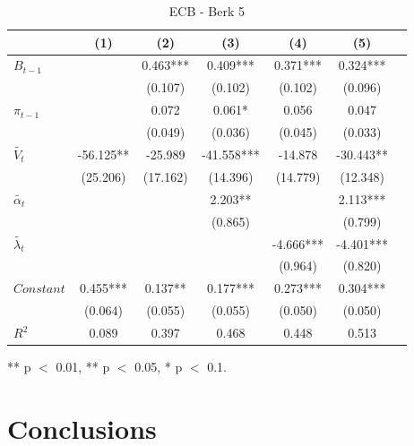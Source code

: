 \documentclass[review]{elsarticle}
\begin{document}
\begin{table}[!ht]
\centering 
  \caption{ECB - Berk 5} 
  \label{tab:ECB - Berk 5}
\begin{tabular}{l*{6}{c}}   
\toprule
                    & (1) & (2) & (3) & (4) & (5) \\
\midrule
$B_{t-1}$           &     & 0.463*** & 0.409*** & 0.371*** & 0.324*** \\
                    &     & (0.107) & (0.102) & (0.102) & (0.096) \\
$\pi_{t-1}$         &     & 0.072 & 0.061* & 0.056 & 0.047 \\
                    &     & (0.049) & (0.036) & (0.045) & (0.033) \\
$\tilde{V_t}$       & -56.125** & -25.989 & -41.558*** & -14.878 & -30.443** \\
                    & (25.206) & (17.162) & (14.396) & (14.779) & (12.348) \\
$\tilde{\alpha_t}$  &     &     & 2.203** &     & 2.113*** \\
                    &     &     & (0.865) &     & (0.799) \\
$\tilde{\lambda_t}$ &     &     &     & -4.666*** & -4.401*** \\
                    &     &     &     & (0.964) & (0.820) \\
$Constant$          & 0.455*** & 0.137** & 0.177*** & 0.273*** & 0.304*** \\
                    & (0.064) & (0.055) & (0.055) & (0.050) & (0.050) \\
\midrule
$R^2$               & 0.089 & 0.397 & 0.468 & 0.448 & 0.513 \\
\bottomrule
\end{tabular} 
\parbox{0.8\textwidth}{\centering \small *** p $<$ 0.01, ** p $<$ 0.05, * p $<$ 0.1.}
\end{table}

\section{Conclusions} \label{sec:Conclusions}




\newpage

\appendix
\end{document}
